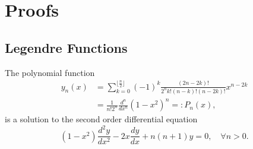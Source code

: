 \section{Proofs}

\subsection{Legendre Functions} \label{kugel:sec:proofs:legendre}


\begin{lemma}
    The polynomial function
    \begin{align*}
        y_n(x)&=\sum_{k=0}^{\lfloor \frac{n}{2} \rfloor} (-1)^k \frac{(2n-2k)!}{2^n k! (n-k)!(n-2k)!} x^{n-2k}\\
        &= \frac{1}{n!2^n}\frac{d^n}{dx^n}(1-x^2)^n =: P_n(x),
    \end{align*}
    is a solution to the second order differential equation
    \begin{equation}\label{kugel:eq:sol_leg}
        (1-x^2)\frac{d^2y}{dx^2}-2x\frac{dy}{dx} + n(n+1)y=0, \quad \forall n>0.
    \end{equation}
\end{lemma}
